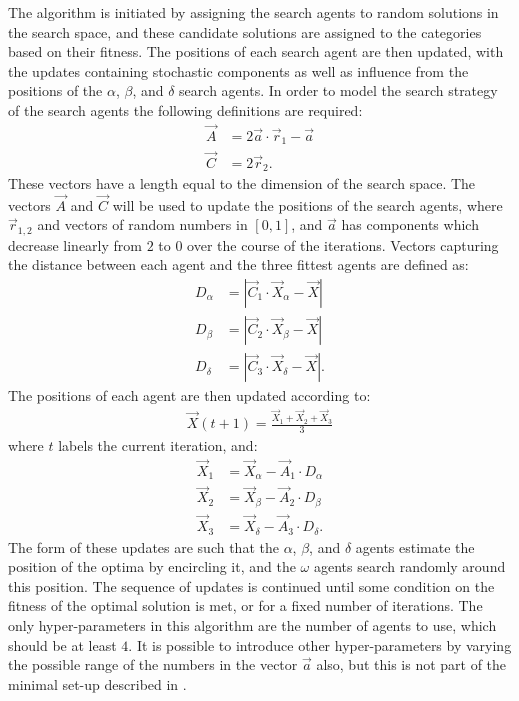 \documentclass[11pt]{article}
\begin{document}
The algorithm is initiated by assigning the search agents to random solutions in the search space, and these candidate solutions are assigned to the categories based on their fitness.  The positions of each search agent are then updated, with the updates containing stochastic components as well as influence from the positions of the $\alpha$, $\beta$, and $\delta$ search agents.  In order to model the search strategy of the search agents the following definitions are required:
\begin{align}
\vec{A}&=2\vec{a}\cdot \vec{r}_1 - \vec{a} \nonumber \\
\vec{C}&=2\vec{r}_2.
\end{align}
These vectors have a length equal to the dimension of the search space.  The vectors $\vec{A}$ and $\vec{C}$ will be used to update the positions of the search agents, where $\vec{r}_{1,2}$ and vectors of random numbers in $[0,1]$, and $\vec{a}$ has components which decrease linearly from $2$ to $0$ over the course of the iterations.  Vectors capturing the distance between each agent and the three fittest agents are defined as:
\begin{align}
D_{\alpha}&=|\vec{C}_1\cdot \vec{X}_{\alpha}-\vec{X}| \nonumber \\
D_{\beta}&=|\vec{C}_2\cdot \vec{X}_{\beta}-\vec{X}| \nonumber \\
D_{\delta}&=|\vec{C}_3\cdot \vec{X}_{\delta}-\vec{X}|.
\end{align}
The positions of each agent are then updated according to:
\begin{align}
\vec{X}(t+1)=\frac{\vec{X}_1+\vec{X}_2+\vec{X}_3}{3}
\end{align}
where $t$ labels the current iteration, and:
\begin{align}
\vec{X}_1&=\vec{X}_{\alpha}-\vec{A}_1\cdot D_{\alpha} \nonumber \\
\vec{X}_2&=\vec{X}_{\beta}-\vec{A}_2\cdot D_{\beta} \nonumber \\
\vec{X}_3&=\vec{X}_{\delta}-\vec{A}_3\cdot D_{\delta}.
\end{align}
The form of these updates are such that the $\alpha$, $\beta$, and $\delta$ agents estimate the position of the optima by encircling it, and the $\omega$ agents search randomly around this position.  The sequence of updates is continued until some condition on the fitness of the optimal solution is met, or for a fixed number of iterations.  The only hyper-parameters in this algorithm are the number of agents to use, which should be at least $4$.  It is possible to introduce other hyper-parameters by varying the possible range of the numbers in the vector $\vec{a}$ also, but this is not part of the minimal set-up described in \cite{gworef}.
\end{document}
